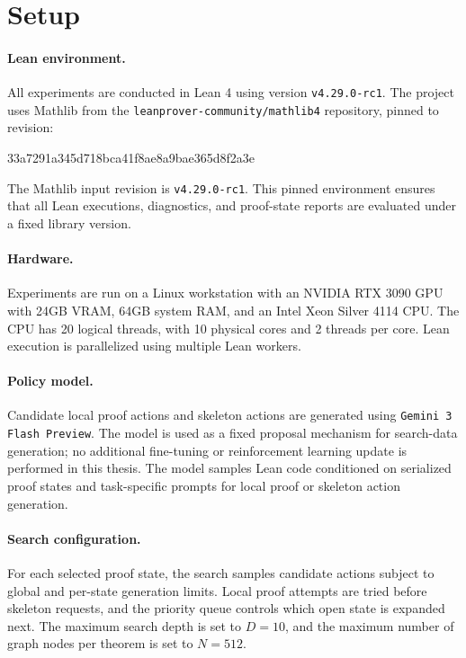\section{Setup}

\paragraph{Lean environment.}
All experiments are conducted in Lean 4 using version \texttt{v4.29.0-rc1}. The project uses Mathlib \citep{mathlib2020}
from the \texttt{leanprover-community/mathlib4} repository, pinned to revision:
\begin{leanblock}
33a7291a345d718bca41f8ae8a9bae365d8f2a3e
\end{leanblock}
The Mathlib input revision is \texttt{v4.29.0-rc1}. This pinned environment ensures that all Lean
executions, diagnostics, and proof-state reports are evaluated under a fixed library version.

\paragraph{Hardware.}
Experiments are run on a Linux workstation with an NVIDIA RTX 3090 GPU with 24GB VRAM, 64GB
system RAM, and an Intel Xeon Silver 4114 CPU. The CPU has 20 logical threads, with 10 physical cores
and 2 threads per core. Lean execution is parallelized using multiple Lean workers.

\paragraph{Policy model.}
Candidate local proof actions and skeleton actions are generated using \texttt{Gemini 3 Flash Preview}. The model is used
as a fixed proposal mechanism for search-data generation; no additional fine-tuning or reinforcement
learning update is performed in this thesis. The model samples Lean code conditioned on serialized proof
states and task-specific prompts for local proof or skeleton action generation.

\paragraph{Search configuration.}
For each selected proof state, the search samples candidate actions subject to global and per-state
generation limits. Local proof attempts are tried before skeleton requests, and the priority queue controls
which open state is expanded next. The maximum search depth is set to \(D=10\), and the maximum
number of graph nodes per theorem is set to \(N=512\).

